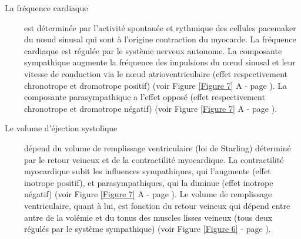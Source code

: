 \documentclass[a4paper,12pt,twoside]{report}
\begin{document}
\begin{description}
\item [\textbullet~La fréquence cardiaque] est déterminée par l’activité spontanée et rythmique des cellules pacemaker du nœud sinusal qui sont à l’origine contraction du myocarde. La fréquence cardiaque est régulée par le système nerveux autonome. La composante sympathique augmente la fréquence des impulsions du nœud sinusal et leur vitesse de conduction via le nœud atrioventriculaire (effet respectivement chronotrope et dromotrope positif) (voir Figure \ref{Figure 7} A - page \pageref{Figure 7}). La composante parasympathique a l’effet opposé (effet respectivement chronotrope et dromotrope négatif) (voir Figure \ref{Figure 7} A - page \pageref{Figure 7}).
\item [\textbullet~Le volume d’éjection systolique] dépend du volume de remplissage ventriculaire (loi de Starling) déterminé par le retour veineux et de la contractilité myocardique. La contractilité myocardique subit les influences sympathiques, qui l’augmente (effet inotrope positif), et parasympathiques, qui la diminue (effet inotrope négatif) (voir Figure \ref{Figure 7} A - page \pageref{Figure 7}). Le volume de remplissage ventriculaire, quant à lui, est fonction du retour veineux qui dépend entre autre de la volémie et du tonus des muscles lisses veineux (tous deux régulés par le système sympathique) (voir Figure \ref{Figure 6} - page \pageref{Figure 6}).
\end{description}
\end{document}
